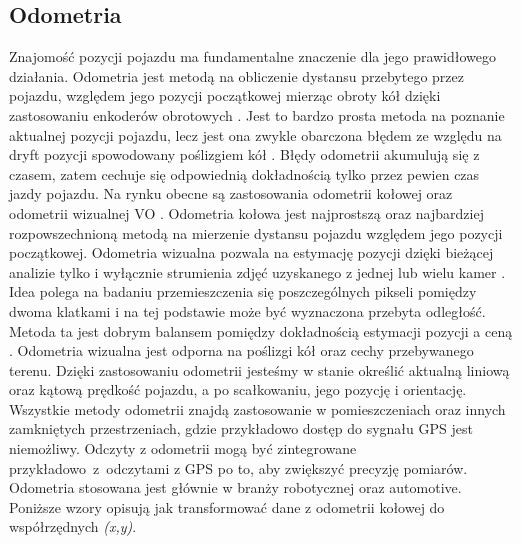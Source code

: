 {    \subsection{Odometria}
    {
        Znajomość pozycji pojazdu ma fundamentalne znaczenie dla jego prawidłowego działania. Odometria jest metodą na obliczenie dystansu przebytego przez pojazdu, względem jego pozycji początkowej mierząc obroty kół dzięki zastosowaniu enkoderów obrotowych \cite{odometry}. Jest to bardzo prosta metoda na poznanie aktualnej pozycji pojazdu, lecz jest ona zwykle obarczona błędem ze względu na dryft pozycji spowodowany poślizgiem kół \cite{odom_2}. Błędy odometrii akumulują się z czasem, zatem cechuje się odpowiednią dokładnością tylko przez pewien czas jazdy pojazdu. Na rynku obecne są zastosowania odometrii kołowej oraz odometrii wizualnej VO \cite{odom_2}. Odometria kołowa jest najprostszą oraz najbardziej rozpowszechnioną metodą na mierzenie dystansu pojazdu względem jego pozycji początkowej. Odometria wizualna pozwala na estymację pozycji dzięki bieżącej analizie tylko i wyłącznie strumienia zdjęć uzyskanego z jednej lub wielu kamer \cite{odom_2}. Idea polega na badaniu przemieszczenia się poszczególnych pikseli pomiędzy dwoma klatkami i na tej podstawie może być wyznaczona przebyta odległość. Metoda ta jest dobrym balansem pomiędzy dokładnością estymacji pozycji a ceną \cite{odom_2}. Odometria wizualna jest odporna na poślizgi kół oraz cechy przebywanego terenu. Dzięki zastosowaniu odometrii jesteśmy w stanie określić aktualną liniową oraz kątową prędkość pojazdu, a po scałkowaniu, jego pozycję i orientację. Wszystkie metody odometrii znajdą zastosowanie w pomieszczeniach oraz innych zamkniętych przestrzeniach, gdzie przykładowo dostęp do sygnału GPS jest niemożliwy. Odczyty z odometrii mogą być zintegrowane przykładowo~z~odczytami z GPS po to, aby zwiększyć precyzję pomiarów. Odometria stosowana jest głównie w branży robotycznej oraz automotive.
        Poniższe wzory opisują jak transformować dane z odometrii kołowej do współrzędnych \textit{(x,y)}.

}}
